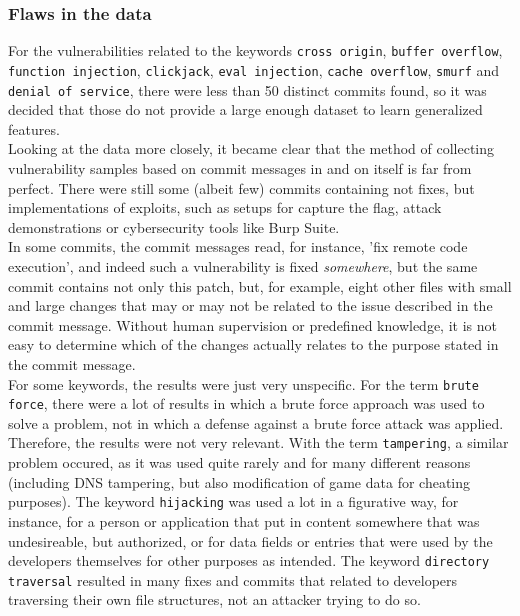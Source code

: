 \documentclass[
a4paper,
pagesize,
pdftex,
12pt,
twoside, %
BCOR=5mm, %
ngerman,
fleqn,
final,
]{scrartcl}
\begin{document}
	\subsubsection{Flaws in the data}\label{data-problems}
	For the vulnerabilities related to the keywords \texttt{cross origin}, \texttt{buffer overflow}, \texttt{function injection}, \texttt{clickjack}, \texttt{eval injection}, \texttt{cache overflow}, \texttt{smurf} and \texttt{denial of service}, there were less than 50 distinct commits found, so it was decided that those do not provide a large enough dataset to learn generalized features. \\
	Looking at the data more closely, it became clear that the method of collecting vulnerability samples based on commit messages in and on itself is far from perfect. There were still some (albeit few) commits containing not fixes, but implementations of exploits, such as setups for capture the flag, attack demonstrations or cybersecurity tools like Burp Suite.\\
	In some commits, the commit messages read, for instance, 'fix remote code execution', and indeed such a vulnerability is fixed \textit{somewhere}, but the same commit contains not only this patch, but, for example, eight other files with small and large changes that may or may not be related to the issue described in the commit message. Without human supervision or predefined knowledge, it is not easy to determine which of the changes actually relates to the purpose stated in the commit message.\\
	For some keywords, the results were just very unspecific. For the term \texttt{brute force}, there were a lot of results in which a brute force approach was used to solve a problem, not in which a defense against a brute force attack was applied. Therefore, the results were not very relevant. With the term \texttt{tampering}, a similar problem occured, as it was used quite rarely and for many different reasons (including DNS tampering, but also modification of game data for cheating purposes). The keyword \texttt{hijacking} was used a lot in a figurative way, for instance, for a person or application that put in content somewhere that was undesireable, but authorized, or for data fields or entries that were used by the developers themselves for other purposes as intended. The keyword \texttt{directory traversal} resulted in many fixes and commits that related to developers traversing their own file structures, not an attacker trying to do so.\\
\end{document}

